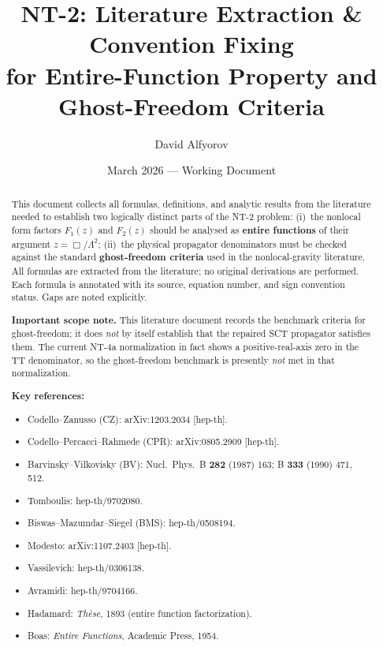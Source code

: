 \documentclass[12pt,a4paper]{article}
\title{\textbf{NT-2: Literature Extraction \& Convention Fixing\\[4pt]
       for Entire-Function Property and Ghost-Freedom Criteria}}
\author{David Alfyorov}
\date{March 2026 --- Working Document}
\theoremstyle{definition}
\theoremstyle{remark}
\begin{document}
\maketitle

\begin{center}
\end{center}

\thispagestyle{empty}

\begin{abstract}
This document collects all formulas, definitions, and analytic results
from the literature needed to establish two logically distinct parts of
the NT-2 problem: (i)~the nonlocal form factors $F_1(z)$ and $F_2(z)$
should be analysed as \textbf{entire functions} of their argument
$z = \Box/\Lambda^2$; (ii)~the physical propagator denominators must be
checked against the standard \textbf{ghost-freedom criteria} used in the
nonlocal-gravity literature. All formulas are extracted from the
literature; no original derivations are performed. Each formula is
annotated with its source, equation number, and sign convention status.
Gaps are noted explicitly.

\medskip\noindent
\textbf{Important scope note.}
This literature document records the benchmark criteria for
ghost-freedom; it does \emph{not} by itself establish that the repaired
SCT propagator satisfies them. The current NT-4a normalization in fact
shows a positive-real-axis zero in the TT denominator, so the
ghost-freedom benchmark is presently \emph{not} met in that
normalization.

\medskip\noindent
\textbf{Key references:}
\begin{itemize}[nosep]
\item Codello--Zanusso (CZ): arXiv:1203.2034 [hep-th].
\item Codello--Percacci--Rahmede (CPR): arXiv:0805.2909 [hep-th].
\item Barvinsky--Vilkovisky (BV): Nucl.\ Phys.\ B \textbf{282} (1987) 163;
  B \textbf{333} (1990) 471, 512.
\item Tomboulis: hep-th/9702080.
\item Biswas--Mazumdar--Siegel (BMS): hep-th/0508194.
\item Modesto: arXiv:1107.2403 [hep-th].
\item Vassilevich: hep-th/0306138.
\item Avramidi: hep-th/9704166.
\item Hadamard: \emph{Th\`ese}, 1893 (entire function factorization).
\item Boas: \emph{Entire Functions}, Academic Press, 1954.
\end{itemize}
\end{abstract}
\end{document}
